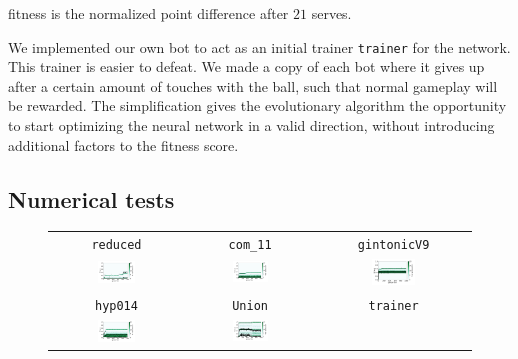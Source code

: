\documentclass[11pt,a4paper]{scrartcl}
\begin{document}
fitness is the normalized point difference after $21$ serves.

We implemented our own bot to act as an initial trainer \texttt{trainer} for the network.
This trainer is easier to defeat.
We made a copy of each bot where it gives up after a certain amount of touches with the ball, such that normal gameplay will be rewarded.
The simplification gives the evolutionary algorithm the opportunity to start optimizing the neural network in a valid direction, without introducing additional factors to the fitness score.


\subsection{Numerical tests}

\begin{figure}[H]
\center
\begin{tabular}{ccc}
\texttt{reduced} & \texttt{com\_11} & \texttt{gintonicV9} \\
\includegraphics[width=0.3\textwidth]{img/standard_reduced.png} &
\includegraphics[width=0.3\textwidth]{img/standard_com_11.png} &
\includegraphics[width=0.3\textwidth]{img/standard_gintonicV9.png} \\
\texttt{hyp014} & \texttt{Union} & \texttt{trainer} \\
\includegraphics[width=0.3\textwidth]{img/standard_hyp014.png} &
\includegraphics[width=0.3\textwidth]{img/standard_Union.png} &

\end{tabular}
\end{figure}
\end{document}
